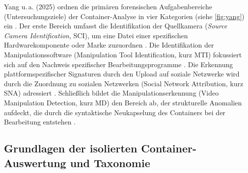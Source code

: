 Yang u.\,a. (2025) ordnen die primären forensischen Aufgabenbereiche (Untersuchungsziele) der Container-Analyse in vier Kategorien (siehe \cref{fig:yang}) ein \cite{yang_comprehensive_2025}. Der erste Bereich umfasst die Identifikation der Quellkamera (\textit{Source Camera Identification}, SCI), um eine Datei einer spezifischen Hardwarekomponente oder Marke zuzuordnen \cite[Kap. 5.4.6]{yang_comprehensive_2025}. Die Identifikation der Manipulationssoftware (Manipulation Tool Identification, kurz MTI) fokussiert sich auf den Nachweis spezifischer Bearbeitungsprogramme \cite[Kap. 5.4.5]{yang_comprehensive_2025}. Die Erkennung plattformspezifischer Signaturen durch den Upload auf soziale Netzwerke wird durch die Zuordnung zu sozialen Netzwerken (Social Network Attribution, kurz SNA) adressiert \cite[Kap. 5.4.4]{yang_comprehensive_2025}. Schließlich bildet die Manipulationserkennung (Video Manipulation Detection, kurz MD) den Bereich ab, der strukturelle Anomalien aufdeckt, die durch die syntaktische Neukapselung des Containers bei der Bearbeitung entstehen \cite[Kap. 5.4.7]{yang_comprehensive_2025}.\\


\subsection{Grundlagen der isolierten Container-Auswertung und Taxonomie}

